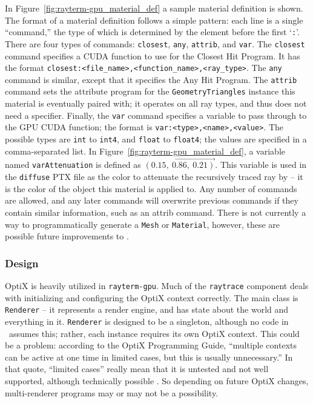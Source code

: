 In Figure~\ref{fig:rayterm-gpu_material_def} a sample material definition is shown.
The format of a material definition follows a simple pattern: each line is a single ``command,'' the type of which is determined by the element before the first `\texttt{:}'.
There are four types of commands: \texttt{closest}, \texttt{any}, \texttt{attrib}, and \texttt{var}.
The \texttt{closest} command specifies a CUDA function to use for the Closest Hit Program.
It has the format \texttt{closest:<file\_name>,<function\_name>,<ray\_type>}.
The \texttt{any} command is similar, except that it specifies the Any Hit Program.
The \texttt{attrib} command sets the attribute program for the \texttt{GeometryTriangles} instance this material is eventually paired with; it operates on all ray types, and thus does not need a specifier.
Finally, the \texttt{var} command specifies a variable to pass through to the GPU CUDA function; the format is \texttt{var:<type>,<name>,<value>}.
The possible types are \texttt{int} to \texttt{int4}, and \texttt{float} to \texttt{float4}; the values are specified in a comma-separated list.
In Figure~\ref{fig:rayterm-gpu_material_def}, a variable named \texttt{varAttenuation} is defined as $\vec{(0.15,\ 0.86,\ 0.21)}$.
This variable is used in the \texttt{diffuse} PTX file as the color to attenuate the recursively traced ray by -- it is the color of the object this material is applied to.
Any number of commands are allowed, and any later commands will overwrite previous commands if they contain similar information, such as an attrib command.
There is not currently a way to programmatically generate a \texttt{Mesh} or \texttt{Material}, however, these are possible future improvements to \name.


\subsubsection{Design} \label{ch:methods:renderer:parallel:design}

OptiX is heavily utilized in \texttt{rayterm-gpu}.
Much of the \texttt{raytrace} component deals with initializing and configuring the OptiX context correctly.
The main class is \texttt{Renderer} -- it represents a render engine, and has state about the world and everything in it.
\texttt{Renderer} is designed to be a singleton, although no code in \name\ assumes this; rather, each instance requires its own OptiX context.
This could be a problem: according to the OptiX Programming Guide, ``multiple contexts can be active at one time in limited cases, but this is usually unnecessary.''
In that quote, ``limited cases'' really mean that it is untested and not well supported, although technically possible \cite{nvidia2019optixdoc}.
So depending on future OptiX changes, multi-renderer programs may or may not be a possibility.

